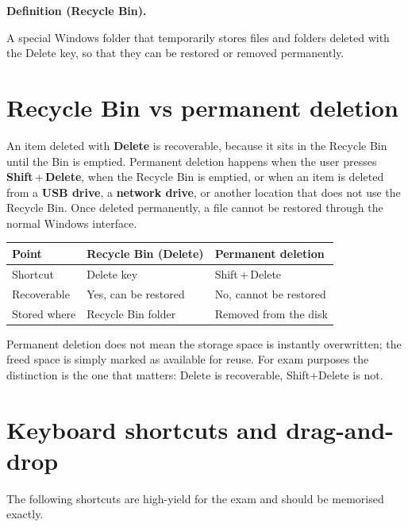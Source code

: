 \documentclass[11pt]{article}
\newenvironment{definitionbox}[1]{%
  \par\noindent\textbf{Definition (#1).}\ \itshape
}{\par\vspace{0.3em}}
\begin{document}
\begin{definitionbox}{Recycle Bin}
A special Windows folder that temporarily stores files and folders deleted
with the Delete key, so that they can be restored or removed permanently.
\end{definitionbox}

\section{Recycle Bin vs permanent deletion}
An item deleted with \textbf{Delete} is recoverable, because it sits in the
Recycle Bin until the Bin is emptied. Permanent deletion happens when the
user presses \textbf{Shift}\,+\,\textbf{Delete}, when the Recycle Bin is
emptied, or when an item is deleted from a \textbf{USB drive}, a
\textbf{network drive}, or another location that does not use the Recycle
Bin. Once deleted permanently, a file cannot be restored through the normal
Windows interface.

\begin{center}
\begin{tabular}{p{}p{}p{}}
\toprule
\textbf{Point} & \textbf{Recycle Bin (Delete)} & \textbf{Permanent deletion} \\
\midrule
Shortcut & Delete key & Shift\,+\,Delete \\
Recoverable & Yes, can be restored & No, cannot be restored \\
Stored where & Recycle Bin folder & Removed from the disk \\
\bottomrule
\end{tabular}
\end{center}

Permanent deletion does not mean the storage space is instantly overwritten;
the freed space is simply marked as available for reuse. For exam purposes
the distinction is the one that matters: Delete is recoverable, Shift+Delete
is not.

\section{Keyboard shortcuts and drag-and-drop}
The following shortcuts are high-yield for the exam and should be memorised
exactly.
\end{document}
